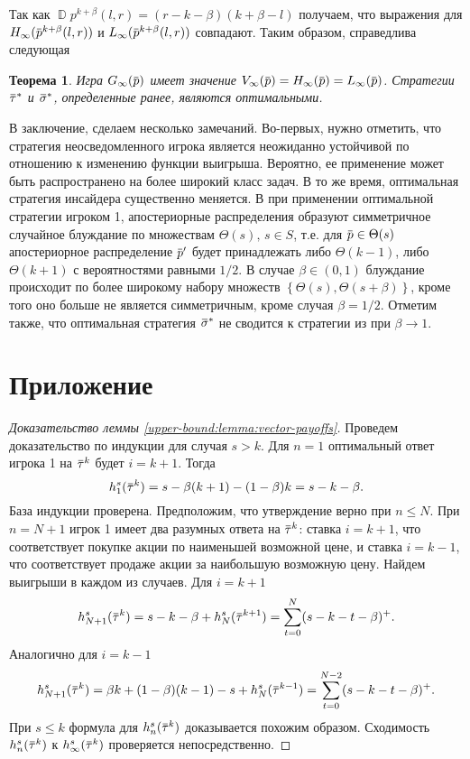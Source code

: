 \documentclass[12pt, draft]{extarticle}
\newtheorem{theorem}{Теорема}
\newcommand{\overbar}[1]%
{\mkern 1.5mu\overline{\mkern-1.3mu#1\mkern-1.3mu}\mkern 1.3mu}
\newcommand{\p}{\ensuremath{\overbar{p}}}
\DeclareMathOperator{\D}{\mathbb{D}}
\newcommand{\G}[1][n]{\ensuremath{G_{#1}}}
\newcommand{\V}[1][n]{\ensuremath{V_{#1}}}
\newcommand{\High}[1][\ensuremath{\infty}]{\ensuremath{H_{#1}}}
\newcommand{\sigmav}{\ensuremath{\overbar{\sigma}}}
\newcommand{\tauv}{\ensuremath{\overbar{\tau}}}
\newcommand{\Low}[1][\ensuremath{\infty}]{\ensuremath{L_{#1}}}
\begin{document}
Так как $\D p^{k+\beta}(l, r) = (r-k-\beta)(k+\beta-l)$ получаем, что выражения
для $\High(\p^{k+\beta}(l,r))$ и $\Low(\p^{k+\beta}(l,r))$ совпадают. Таким
образом, справедлива следующая
\begin{theorem}
  \label{solution:theorem}
  Игра $\G[\infty](\p)$ имеет значение $\V[\infty](\p) = \High(\p) = \Low(\p)$.
  Стратегии $\tauv^*$ и $\sigmav^*$, определенные ранее, являются оптимальными.
\end{theorem}

В заключение, сделаем несколько замечаний. Во-первых, нужно отметить, что
стратегия неосведомленного игрока является неожиданно устойчивой по отношению к
изменению функции выигрыша. Вероятно, ее применение может быть распространено на
более широкий класс задач. В то же время, оптимальная стратегия инсайдера
существенно меняется. В \cite{bib:domansky11} при применении оптимальной
стратегии игроком 1, апостериорные распределения образуют симметричное случайное
блуждание по множествам $\Theta(s), \, s \in S$, т.е. для $\p \in \Theta(s)$
апостериорное распределение $\p'$ будет принадлежать либо $\Theta(k-1)$, либо
$\Theta(k+1)$ с вероятностями равными $1/2$. В случае $\beta \in (0, 1)$
блуждание происходит по более широкому набору множеств %
$\left\{ \Theta(s), \Theta(s+\beta) \right\}$, %
кроме того оно больше не является симметричным, кроме случая $\beta = 1/2$.
Отметим также, что оптимальная стратегия $\sigmav^*$ не сводится к стратегии из
\cite{bib:domansky11} при $\beta \rightarrow 1$.

\appendix
\setcounter{secnumdepth}{0}
\section{Приложение}

\begin{proof}[Доказательство леммы \ref{upper-bound:lemma:vector-payoffs}]
  Проведем доказательство по индукции для случая $s > k$. Для $n = 1$
  оптимальный ответ игрока 1 на $\tauv^k$ будет $i = k + 1$. Тогда
  \begin{equation*}
    h^s_1(\tauv^k) = s - \beta(k+1) - (1-\beta)k = s - k - \beta.
  \end{equation*}
  База индукции проверена. Предположим, что утверждение верно при $n \leqslant
  N$. При $n = N + 1$ игрок 1 имеет два разумных ответа на $\tauv^k$: ставка $i
  = k + 1$, что соответствует покупке акции по наименьшей возможной цене, и
  ставка $i = k - 1$, что соответствует продаже акции за наибольшую возможную
  цену. Найдем выигрыши в каждом из случаев. Для $i = k + 1$
  \begin{equation*}
    h^s_{N+1}(\tauv^k) = s - k - \beta + h^s_N(\tauv^{k+1}) =
    \sum_{t=0}^N(s-k-t-\beta)^+.
  \end{equation*}
  Аналогично для $i = k - 1$
  \begin{equation*}
    h^s_{N+1}(\tauv^k) = \beta k + (1-\beta)(k-1) - s + h^s_N(\tauv^{k-1}) =
    \sum_{t=0}^{N-2}(s-k-t-\beta)^+.
  \end{equation*}
  При $s \leqslant k$ формула для $h^s_n(\tauv^k)$ доказывается похожим образом.
  Сходимость $h^s_n(\tauv^k)$ к $h^s_\infty(\tauv^k)$ проверяется
  непосредственно.
\end{proof}
\end{document}

